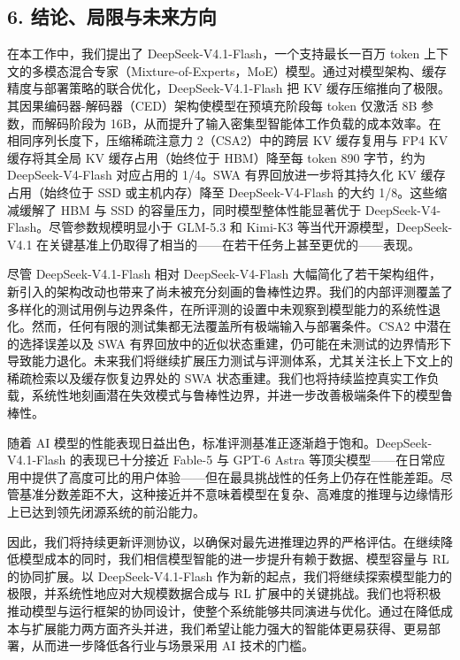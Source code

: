 \subsection{6. 结论、局限与未来方向}\label{conclusion-limitations-and-future-directions}

在本工作中，我们提出了 DeepSeek-V4.1-Flash，一个支持最长一百万 token 上下文的多模态混合专家（Mixture-of-Experts，MoE）模型。通过对模型架构、缓存精度与部署策略的联合优化，DeepSeek-V4.1-Flash 把 KV 缓存压缩推向了极限。其因果编码器-解码器（CED）架构使模型在预填充阶段每 token 仅激活 8B 参数，而解码阶段为 16B，从而提升了输入密集型智能体工作负载的成本效率。在相同序列长度下，压缩稀疏注意力 2（CSA2）中的跨层 KV 缓存复用与 FP4 KV 缓存将其全局 KV 缓存占用（始终位于 HBM）降至每 token 890 字节，约为 DeepSeek-V4-Flash 对应占用的 1/4。SWA 有界回放进一步将其持久化 KV 缓存占用（始终位于 SSD 或主机内存）降至 DeepSeek-V4-Flash 的大约 1/8。这些缩减缓解了 HBM 与 SSD 的容量压力，同时模型整体性能显著优于 DeepSeek-V4-Flash。尽管参数规模明显小于 GLM-5.3 和 Kimi-K3 等当代开源模型，DeepSeek-V4.1 在关键基准上仍取得了相当的——在若干任务上甚至更优的——表现。

尽管 DeepSeek-V4.1-Flash 相对 DeepSeek-V4-Flash 大幅简化了若干架构组件，新引入的架构改动也带来了尚未被充分刻画的鲁棒性边界。我们的内部评测覆盖了多样化的测试用例与边界条件，在所评测的设置中未观察到模型能力的系统性退化。然而，任何有限的测试集都无法覆盖所有极端输入与部署条件。CSA2 中潜在的选择误差以及 SWA 有界回放中的近似状态重建，仍可能在未测试的边界情形下导致能力退化。未来我们将继续扩展压力测试与评测体系，尤其关注长上下文上的稀疏检索以及缓存恢复边界处的 SWA 状态重建。我们也将持续监控真实工作负载，系统性地刻画潜在失效模式与鲁棒性边界，并进一步改善极端条件下的模型鲁棒性。

随着 AI 模型的性能表现日益出色，标准评测基准正逐渐趋于饱和。DeepSeek-V4.1-Flash 的表现已十分接近 Fable-5 与 GPT-6 Astra 等顶尖模型——在日常应用中提供了高度可比的用户体验——但在最具挑战性的任务上仍存在性能差距。尽管基准分数差距不大，这种接近并不意味着模型在复杂、高难度的推理与边缘情形上已达到领先闭源系统的前沿能力。

因此，我们将持续更新评测协议，以确保对最先进推理边界的严格评估。在继续降低模型成本的同时，我们相信模型智能的进一步提升有赖于数据、模型容量与 RL 的协同扩展。以 DeepSeek-V4.1-Flash 作为新的起点，我们将继续探索模型能力的极限，并系统性地应对大规模数据合成与 RL 扩展中的关键挑战。我们也将积极推动模型与运行框架的协同设计，使整个系统能够共同演进与优化。通过在降低成本与扩展能力两方面齐头并进，我们希望让能力强大的智能体更易获得、更易部署，从而进一步降低各行业与场景采用 AI 技术的门槛。



